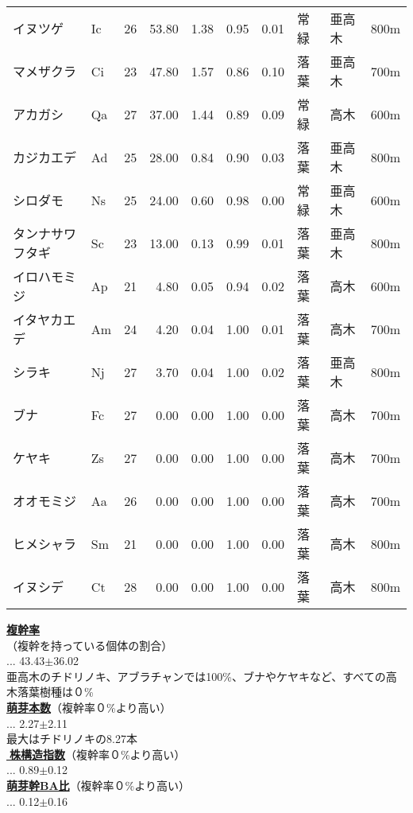 \documentclass[a0, 30pt, plainboxedsections]{sciposter} %
\begin{document}
\begin{multicols}{2}
\begin{mdframed}[style=subsection.frame,frametitle={\huge\textbf{\color{Black1}{\LARGE{\ding{192}}\Large{25種の株構造は種間で大きく異なる}}}}]
\begin{wraptable}{r}{18em}
{\begin{tabular}{llrrrrrlll}
\rowcolor{white}イヌツゲ & Ic &  26 & 53.80 & 1.38 & 0.95 & 0.01 & 常緑 & 亜高木 & 800m \\ 
\rowcolor{white}マメザクラ & Ci &  23 & 47.80 & 1.57 & 0.86 & 0.10 & 落葉 & 亜高木 & 700m \\ 
\rowcolor{white}アカガシ & Qa &  27 & 37.00 & 1.44 & 0.89 & 0.09 & 常緑 & 高木 & 600m \\ 
\rowcolor{white}カジカエデ & Ad &  25 & 28.00 & 0.84 & 0.90 & 0.03 & 落葉 & 亜高木 & 800m \\ 
\rowcolor{white}シロダモ & Ns &  25 & 24.00 & 0.60 & 0.98 & 0.00 & 常緑 & 亜高木 & 600m \\ 
\rowcolor{white}タンナサワフタギ & Sc &  23 & 13.00 & 0.13 & 0.99 & 0.01 & 落葉 & 亜高木 & 800m \\ 
\rowcolor{white}イロハモミジ & Ap &  21 & 4.80 & 0.05 & 0.94 & 0.02 & 落葉 & 高木 & 600m \\ 
\rowcolor{white}イタヤカエデ & Am &  24 & 4.20 & 0.04 & 1.00 & 0.01 & 落葉 & 高木 & 700m \\ 
\rowcolor{white}シラキ & Nj &  27 & 3.70 & 0.04 & 1.00 & 0.02 & 落葉 & 亜高木 & 800m \\ 
\rowcolor{Blue2!80}ブナ & Fc &  27 & 0.00 & 0.00 & 1.00 & 0.00 & 落葉 & 高木 & 700m \\ 
\rowcolor{Blue2!80}ケヤキ & Zs &  27 & 0.00 & 0.00 & 1.00 & 0.00 & 落葉 & 高木 & 700m \\ 
\rowcolor{Blue2!80}オオモミジ & Aa &  26 & 0.00 & 0.00 & 1.00 & 0.00 & 落葉 & 高木 & 700m \\ 
\rowcolor{Blue2!80}ヒメシャラ & Sm &  21 & 0.00 & 0.00 & 1.00 & 0.00 & 落葉 & 高木 & 800m \\ 
\rowcolor{Blue2!80}イヌシデ & Ct &  28 & 0.00 & 0.00 & 1.00 & 0.00 & 落葉 & 高木 & 800m \\ 
   \hline
\end{tabular}}
\end{wraptable}

\textbf{\underline{複幹率}}\\{\footnotesize（複幹を持っている個体の割合）}\\... 43.43$\pm$36.02\\
{\scriptsize 亜高木のチドリノキ、アブラチャンでは100\%、ブナやケヤキなど、すべての高木落葉樹種は０\%}\\
\textbf{\underline{萌芽本数}}{\footnotesize（複幹率０\%より高い）}\\... 2.27$\pm$2.11\\
{\scriptsize 最大はチドリノキの8.27本}\\
\textbf{\underline{株構造指数}}{\footnotesize（複幹率０\%より高い）}\\... 0.89$\pm$0.12\\
\textbf{\underline{萌芽幹BA比}}{\footnotesize（複幹率０\%より高い）}\\... 0.12$\pm$0.16


\end{mdframed}
\end{multicols}
\end{document}
